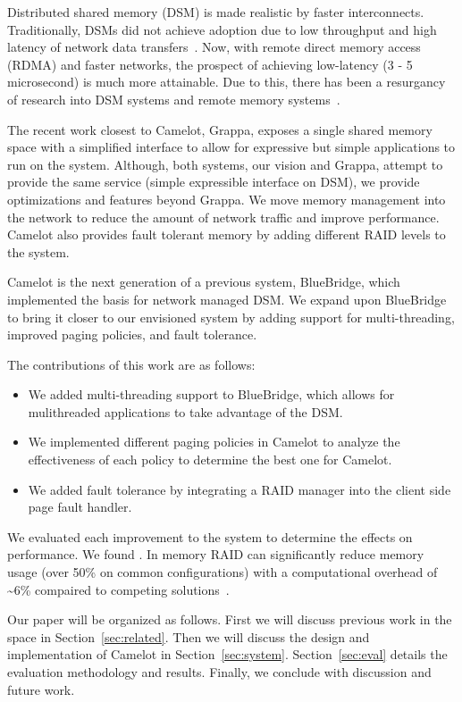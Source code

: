 Distributed shared memory (DSM) is made realistic by faster interconnects.
Traditionally, DSMs did not achieve adoption due to low throughput and high
latency of network data transfers~\cite{Li1989}. Now, with remote direct memory
access (RDMA) and faster networks, the prospect of achieving low-latency (3 - 5
microsecond) is much more attainable. Due to this, there has been a resurgancy
of research into DSM systems and remote memory systems~\cite{Ongaro2011,Nelson2015,Dragojevic2014}. 

The recent work closest to Camelot, Grappa, exposes a single shared memory
space with a simplified interface to allow for expressive but simple
applications to run on the system. Although, both systems, our vision and
Grappa, attempt to provide the same service (simple expressible interface on
DSM), we provide optimizations and features beyond Grappa. We move memory
management into the network to reduce the amount of network traffic and improve
performance. Camelot also provides fault tolerant memory by adding different
RAID levels to the system. 

Camelot is the next generation of a previous system, BlueBridge, which
implemented the basis for network managed DSM. We expand upon BlueBridge to
bring it closer to our envisioned system by adding support for multi-threading,
improved paging policies, and fault tolerance.

The contributions of this work are as follows:
\begin{itemize}
	\item We added multi-threading support to BlueBridge, which allows for
	mulithreaded applications to take advantage of the DSM.
	\item We implemented different paging policies in Camelot to analyze the
	effectiveness of each policy to determine the best one for Camelot.
	\item We added fault tolerance by integrating a RAID manager into the client side page fault handler.
        
\end{itemize}

We evaluated each improvement to the system to determine the effects on
performance. We found . In memory RAID can significantly reduce memory usage
(over 50\% on common configurations) with a computational overhead of \textasciitilde6\%
compaired to competing solutions~\cite{Ousterhout:2015:RSS:2818727.2806887}.

Our paper will be organized as follows. First we will discuss previous work in
the space in Section~\ref{sec:related}. Then we will discuss the design and
implementation of Camelot in Section~\ref{sec:system}. Section~\ref{sec:eval}
details the evaluation methodology and results. Finally, we conclude with
discussion and future work. 
